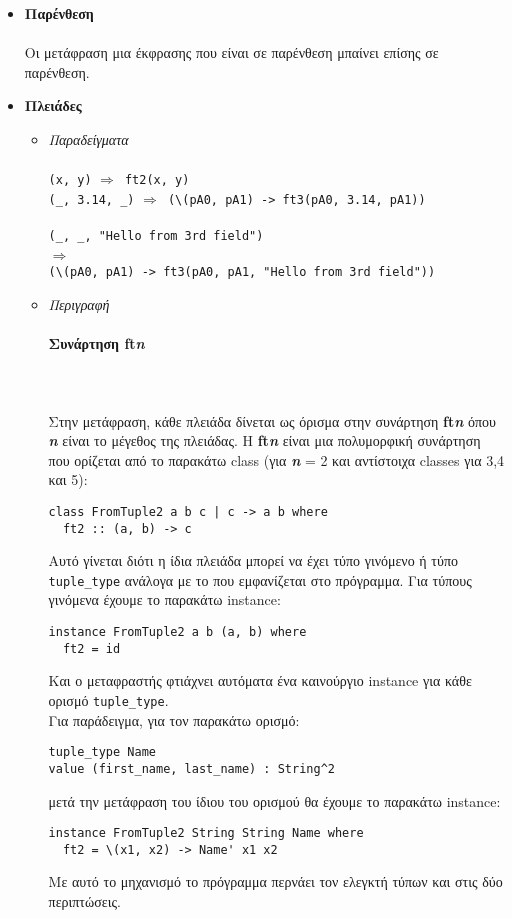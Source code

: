 \documentclass[diploma]{softlab-thesis}
\def\lra{$\Longrightarrow$\ }
\def\pend{\mbox{}\\\\}
\begin{document}
\begin{itemize}
\item
\textbf{Παρένθεση}\\\\
Οι μετάφραση μια έκφρασης που είναι σε παρένθεση μπαίνει επίσης σε παρένθεση.\\

\item
\textbf{Πλειάδες}
\begin{itemize}
\item
\textit{Παραδείγματα}\\\\
\texttt{(x, y)} \lra \texttt{ft2(x, y)} \\
\verb|(_, 3.14, _)| \lra \verb|(\(pA0, pA1) -> ft3(pA0, 3.14, pA1))|\\
\\
\verb|(_, _, "Hello from 3rd field")|
\\
\lra
\\
\verb|(\(pA0, pA1) -> ft3(pA0, pA1, "Hello from 3rd field"))|\\

\item
\textit{Περιγραφή}
\paragraph{Συνάρτηση ft\textit{n}}\pend
Στην μετάφραση, κάθε πλειάδα δίνεται ως όρισμα στην συνάρτηση
\textbf{ft\textit{n}} όπου \textbf{\textit{n}} είναι το μέγεθος της πλειάδας.
Η \textbf{ft\textit{n}} είναι μια πολυμορφική συνάρτηση που ορίζεται από
το παρακάτω class (για \textbf{\textit{n}} = 2 και αντίστοιχα classes
για 3,4 και 5):
\begin{verbatim}
class FromTuple2 a b c | c -> a b where
  ft2 :: (a, b) -> c
\end{verbatim}
Αυτό γίνεται διότι η ίδια πλειάδα μπορεί να έχει τύπο γινόμενο ή τύπο
\verb|tuple_type| ανάλογα με το που εμφανίζεται στο πρόγραμμα. Για τύπους
γινόμενα έχουμε το παρακάτω instance:
\begin{verbatim}
instance FromTuple2 a b (a, b) where
  ft2 = id
\end{verbatim}
Και ο μεταφραστής φτιάχνει αυτόματα ένα καινούργιο instance για κάθε ορισμό
\verb|tuple_type|.\\
Για παράδειγμα, για τον παρακάτω ορισμό:
\begin{verbatim}
tuple_type Name
value (first_name, last_name) : String^2
\end{verbatim}
μετά την μετάφραση του ίδιου του ορισμού θα έχουμε το παρακάτω instance:
\begin{verbatim}
instance FromTuple2 String String Name where
  ft2 = \(x1, x2) -> Name' x1 x2
\end{verbatim}
Με αυτό το μηχανισμό το πρόγραμμα περνάει τον ελεγκτή τύπων και στις δύο
περιπτώσεις.


\end{itemize}
\end{itemize}
\end{document}
